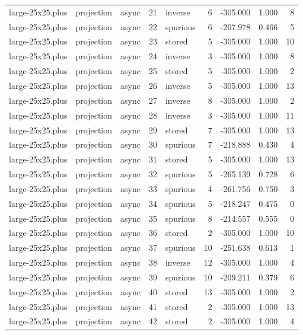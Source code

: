 \begin{tabular}{lllrlrrrr}
large-25x25.plus & projection & async & 21 & inverse & 6 & -305.000 & 1.000 & 8 \\
large-25x25.plus & projection & async & 22 & spurious & 6 & -207.978 & 0.466 & 5 \\
large-25x25.plus & projection & async & 23 & stored & 5 & -305.000 & 1.000 & 10 \\
large-25x25.plus & projection & async & 24 & inverse & 3 & -305.000 & 1.000 & 8 \\
large-25x25.plus & projection & async & 25 & stored & 5 & -305.000 & 1.000 & 2 \\
large-25x25.plus & projection & async & 26 & inverse & 5 & -305.000 & 1.000 & 13 \\
large-25x25.plus & projection & async & 27 & inverse & 8 & -305.000 & 1.000 & 2 \\
large-25x25.plus & projection & async & 28 & inverse & 3 & -305.000 & 1.000 & 11 \\
large-25x25.plus & projection & async & 29 & stored & 7 & -305.000 & 1.000 & 13 \\
large-25x25.plus & projection & async & 30 & spurious & 7 & -218.888 & 0.430 & 4 \\
large-25x25.plus & projection & async & 31 & stored & 5 & -305.000 & 1.000 & 13 \\
large-25x25.plus & projection & async & 32 & spurious & 5 & -265.139 & 0.728 & 6 \\
large-25x25.plus & projection & async & 33 & spurious & 4 & -261.756 & 0.750 & 3 \\
large-25x25.plus & projection & async & 34 & spurious & 5 & -218.247 & 0.475 & 0 \\
large-25x25.plus & projection & async & 35 & spurious & 8 & -214.557 & 0.555 & 0 \\
large-25x25.plus & projection & async & 36 & stored & 2 & -305.000 & 1.000 & 10 \\
large-25x25.plus & projection & async & 37 & spurious & 10 & -251.638 & 0.613 & 1 \\
large-25x25.plus & projection & async & 38 & inverse & 12 & -305.000 & 1.000 & 4 \\
large-25x25.plus & projection & async & 39 & spurious & 10 & -209.211 & 0.379 & 6 \\
large-25x25.plus & projection & async & 40 & stored & 13 & -305.000 & 1.000 & 2 \\
large-25x25.plus & projection & async & 41 & stored & 2 & -305.000 & 1.000 & 13 \\
large-25x25.plus & projection & async & 42 & stored & 2 & -305.000 & 1.000 & 4 \\

\end{tabular}

